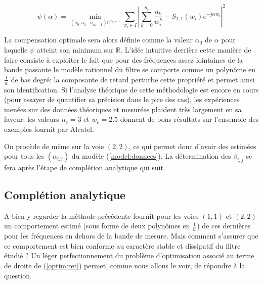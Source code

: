 \documentclass[12]{article}
\def\CC{{\mathbb C}}
\def\RR{{\mathbb R}}
\begin{document}
\begin{equation}
\label{optim:ret}
\psi(\alpha)=\min_{(a_0,a_1 \dots a_{n_c-1}) \CC^{n_c-1}}
\sum_{w_i \in I} \left | 
\sum_{k=0}^{n_c} \frac{a_k}{w_i^k} - S_{1,1}(w_i)e^{-j \alpha w_i}
\right |^2  
\end{equation}

La compensation optimale sera alors d\'efinie comme
la valeur $\alpha_{0}$ de $\alpha$ pour laquelle $\psi$ atteint son minimum sur
$\RR$.
L'id\'ee intuitive  derri\`ere cette
mani\`ere de faire consiste \`a exploiter le fait que pour des
fr\'equences assez lointaines de la bande passante le mod\`ele
rationnel du filtre se comporte comme un polyn\^ome en $\frac{1}{w}$ de bas
degr\'e: la composante de retard perturbe cette propri\'et\'e et permet
ainsi son identification. Si l'analyse th\'eorique de cette
m\'ethodologie est encore en cours (pour essayer de quantifier sa
pr\'ecision dans le pire des cas), les exp\'eriences men\'ees sur des
donn\'ees th\'eoriques et mesur\'ees plaident tr\`es largement en sa
faveur; les valeurs $n_c=3$ et $w_c=2.5$ donnent de bons r\'esultats
sur l'ensemble des exemples fournit par Alcatel. 

On proc\`ede de m\^eme sur la voie $(2,2)$, ce qui permet donc d'avoir
des estim\'ees pour tous les $(\alpha_{i,i})$ du mod\`ele
(\ref{model:donnees}). La d\'etermination des $\beta_{i,j}$ se fera
apr\`es l'\'etape de compl\'etion analytique qui suit.     


\subsection{Compl\'etion analytique}
\label{sec:comp}
A bien y regarder la m\'ethode pr\'ec\'edente fournit pour les voies
$(1,1)$ et $(2,2)$ un comportement estim\'e (sous forme de deux polyn\^omes
en $\frac{1}{w}$) de ces derni\`eres pour les fr\'equences en dehors de
la bande de mesure. Mais comment s'assurer que ce comportement est bien
conforme au caract\`ere stable et dissipatif du filtre \'etudi\'e ? Un
l\'eger perfectionnement du probl\`eme d'optimisation associ\'e au terme de droite 
de (\ref{optim:ret}) permet, comme nous allons le voir, de r\'epondre \`a
la question. 
\end{document}
